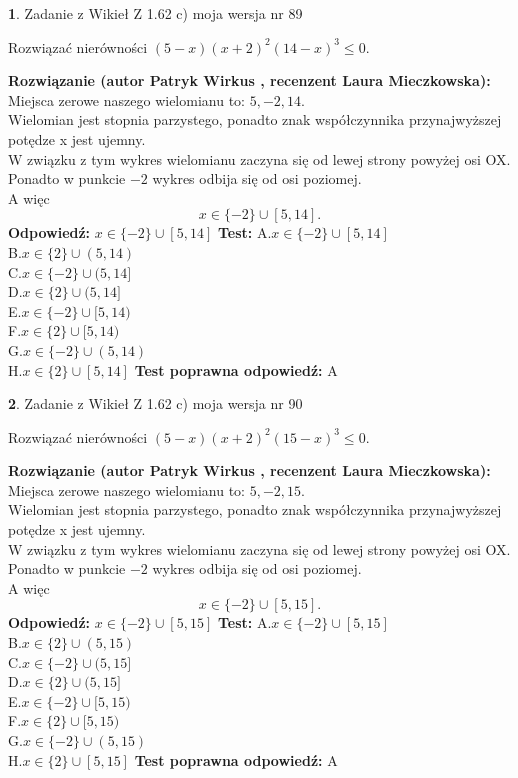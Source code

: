 \documentclass[12pt, a4paper]{article}
\theoremstyle{definition} %
\newtheorem{zad}{}
\newcommand{\zadStart}[1]{\begin{zad}#1\newline}
\newcommand{\zadStop}{\end{zad}}
\newcommand{\rozwStart}[2]{\noindent \textbf{Rozwiązanie (autor #1 , recenzent #2): }\newline}
\newcommand{\rozwStop}{\newline}
\newcommand{\odpStart}{\noindent \textbf{Odpowiedź:}\newline}
\newcommand{\odpStop}{\newline}
\newcommand{\testStart}{\noindent \textbf{Test:}\newline}
\newcommand{\testStop}{\newline}
\newcommand{\kluczStart}{\noindent \textbf{Test poprawna odpowiedź:}\newline}
\newcommand{\kluczStop}{\newline}
\begin{document}
\zadStart{Zadanie z Wikieł Z 1.62 c) moja wersja nr 89}

Rozwiązać nierówności $(5-x)(x+2)^{2}(14-x)^{3}\le0$.
\zadStop
\rozwStart{Patryk Wirkus}{Laura Mieczkowska}
Miejsca zerowe naszego wielomianu to: $5, -2, 14$.\\
Wielomian jest stopnia parzystego, ponadto znak współczynnika przy\linebreak najwyższej potędze x jest ujemny.\\ W związku z tym wykres wielomianu zaczyna się od lewej strony powyżej osi OX.\\
Ponadto w punkcie $-2$ wykres odbija się od osi poziomej.\\
A więc $$x \in \{-2\} \cup [5,14].$$
\rozwStop
\odpStart
$x \in \{-2\} \cup [5,14]$
\odpStop
\testStart
A.$x \in \{-2\} \cup [5,14]$\\
B.$x \in \{2\} \cup (5,14)$\\
C.$x \in \{-2\} \cup (5,14]$\\
D.$x \in \{2\} \cup (5,14]$\\
E.$x \in \{-2\} \cup [5,14)$\\
F.$x \in \{2\} \cup [5,14)$\\
G.$x \in \{-2\} \cup (5,14)$\\
H.$x \in \{2\} \cup [5,14]$
\testStop
\kluczStart
A
\kluczStop



\zadStart{Zadanie z Wikieł Z 1.62 c) moja wersja nr 90}

Rozwiązać nierówności $(5-x)(x+2)^{2}(15-x)^{3}\le0$.
\zadStop
\rozwStart{Patryk Wirkus}{Laura Mieczkowska}
Miejsca zerowe naszego wielomianu to: $5, -2, 15$.\\
Wielomian jest stopnia parzystego, ponadto znak współczynnika przy\linebreak najwyższej potędze x jest ujemny.\\ W związku z tym wykres wielomianu zaczyna się od lewej strony powyżej osi OX.\\
Ponadto w punkcie $-2$ wykres odbija się od osi poziomej.\\
A więc $$x \in \{-2\} \cup [5,15].$$
\rozwStop
\odpStart
$x \in \{-2\} \cup [5,15]$
\odpStop
\testStart
A.$x \in \{-2\} \cup [5,15]$\\
B.$x \in \{2\} \cup (5,15)$\\
C.$x \in \{-2\} \cup (5,15]$\\
D.$x \in \{2\} \cup (5,15]$\\
E.$x \in \{-2\} \cup [5,15)$\\
F.$x \in \{2\} \cup [5,15)$\\
G.$x \in \{-2\} \cup (5,15)$\\
H.$x \in \{2\} \cup [5,15]$
\testStop
\kluczStart
A
\kluczStop
\end{document}
